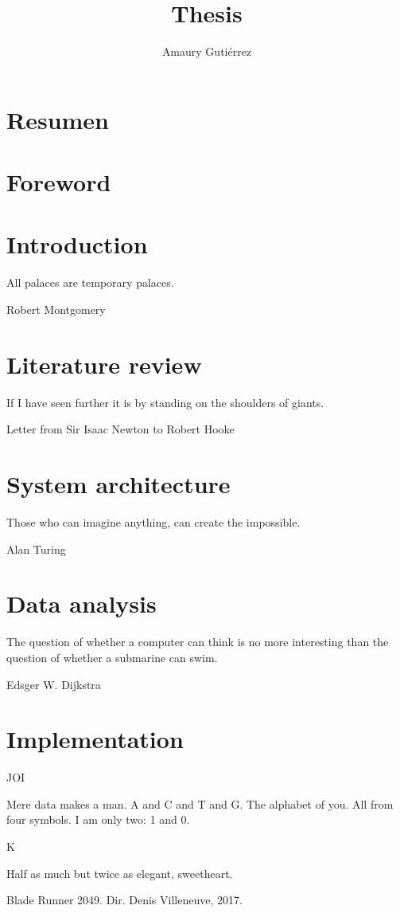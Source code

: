 \documentclass[10pt, oneside]{book}
\author{Amaury Guti\'errez}
\title{Thesis}
\theoremstyle{definition} \newtheorem{definition}{Definición}[section]
\theoremstyle{plain} \newtheorem{theorem}{Teorema}[section]
\theoremstyle{plain} \newtheorem{lemma}{Lema}[section]
\theoremstyle{plain} \newtheorem{proposition}[theorem]{Proposici\'on}
\theoremstyle{plain} \newtheorem{corollary}[theorem]{Corolario}
\theoremstyle{plain} \newtheorem{remark}[theorem]{Comentario}
\begin{document}
\frontmatter



\chapter*{Resumen}






\tableofcontents
\chapter{Foreword}


\mainmatter

\chapter{Introduction}
\epigraph{All palaces are temporary palaces.}{Robert Montgomery}


\chapter{Literature review}
\epigraph{If I have seen further it is by standing on the shoulders of giants.}{Letter from Sir Isaac Newton to Robert Hooke}


\chapter{System architecture}
\epigraph{Those who can imagine anything, can create the impossible.}{Alan Turing}


\chapter{Data analysis}
\epigraph{The question of whether a computer can think is no more interesting than the question of whether a submarine can swim.}{Edsger W. Dijkstra}


\chapter{Implementation}
\epigraph{
\begin{center}
JOI
\end{center} 
Mere data makes a man. A and C and T and G. The alphabet of you. All from four symbols. I am only two: 1 and 0.\\
\begin{center}
K
\end{center}
Half as much but twice as elegant, sweetheart.}{Blade Runner 2049. Dir. Denis Villeneuve, 2017.}

\end{document}
